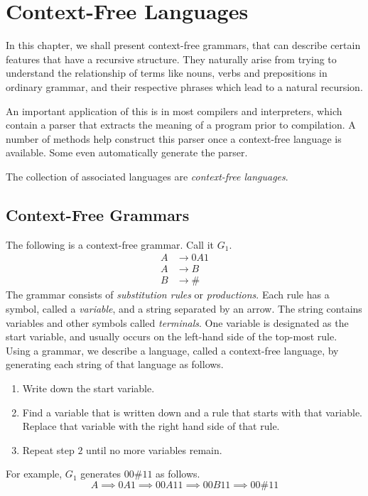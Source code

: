 \section{Context-Free Languages}
In this chapter, we shall present context-free grammars, that can describe certain features that have a recursive structure. They naturally arise from trying to understand the relationship of terms like nouns, verbs and prepositions in ordinary grammar, and their respective phrases which lead to a natural recursion.

An important application of this is in most compilers and interpreters, which contain a parser that extracts the meaning of a program prior to compilation. A number of methods help construct this parser once a context-free language is available. Some even automatically generate the parser.

The collection of associated languages are \textit{context-free languages}.

\subsection{Context-Free Grammars}

\begin{example}
The following is a context-free grammar. Call it $G_1$.
\begin{align*}
    A &\to 0A1 \\
    A &\to B \\
    B &\to \#
\end{align*}
The grammar consists of \textit{substitution rules} or \textit{productions}. Each rule has a symbol, called a \textit{variable}, and a string separated by an arrow. The string contains variables and other symbols called \textit{terminals}. One variable is designated as the start variable, and usually occurs on the left-hand side of the top-most rule. Using a grammar, we describe a language, called a context-free language, by generating each string of that language as follows.
\begin{enumerate}
    \item Write down the start variable.
    \item Find a variable that is written down and a rule that starts with that variable. Replace that variable with the right hand side of that rule.
    \item Repeat step $2$ until no more variables remain.
\end{enumerate}
For example, $G_1$ generates $00\# 11$ as follows.
$$A\implies 0A1\implies 00A11\implies 00B11\implies 00\# 11$$
\end{example}

